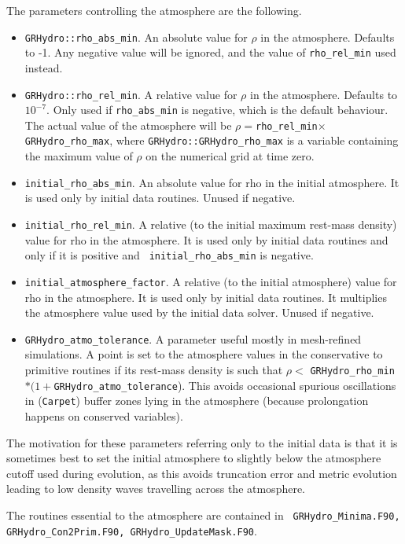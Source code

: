 \documentclass{article}
\begin{document}
The parameters controlling the atmosphere are the following.
\begin{itemize}
\item {\tt GRHydro::rho\_abs\_min}. An absolute value for $\rho$ in the
  atmosphere. Defaults to -1. Any negative value will be ignored, and
  the value of {\tt rho\_rel\_min} used instead.
\item {\tt GRHydro::rho\_rel\_min}. A relative value for $\rho$ in the
  atmosphere. Defaults to $10^{-7}$. Only used if {\tt rho\_abs\_min}
  is negative, which is the default behaviour. The actual value of the
  atmosphere will be $\rho =${\tt rho\_rel\_min}$\times${\tt
    GRHydro\_rho\_max}, where {\tt GRHydro::GRHydro\_rho\_max}
  is a variable containing the maximum value of $\rho$ on the numerical grid at time zero.
\item {\tt initial\_rho\_abs\_min}. An absolute value for rho in the initial atmosphere. It is used
  only by initial data routines. Unused if negative.
\item {\tt initial\_rho\_rel\_min}. A relative (to the initial maximum rest-mass density) value for rho
  in the atmosphere. It is used only by initial data routines and only if it is positive and {\tt
  initial\_rho\_abs\_min} is negative.
\item {\tt initial\_atmosphere\_factor}. A relative (to the initial atmosphere) value for rho in the
  atmosphere. It is used only by initial data routines. It multiplies the atmosphere value used by
  the initial data solver. Unused if negative.
\item {\tt GRHydro\_atmo\_tolerance}. A parameter useful mostly in mesh-refined simulations. A point
  is set to the atmosphere values in the conservative to primitive routines if its rest-mass density
  is such that $\rho <$ {\tt GRHydro\_rho\_min}$*(1+${\tt GRHydro\_atmo\_tolerance}). This avoids
  occasional spurious oscillations in ({\tt Carpet}) buffer zones lying in the atmosphere (because
  prolongation happens on conserved variables).
\end{itemize}

The motivation for these parameters referring only to the initial data is that it is sometimes best
to set the initial atmosphere to slightly below the atmosphere cutoff used during evolution, as this
avoids truncation error and metric evolution leading to low density waves travelling across the
atmosphere.

The routines essential to the atmosphere are contained in {\tt
GRHydro\_Minima.F90, GRHydro\_Con2Prim.F90, GRHydro\_UpdateMask.F90}. 
\end{document}
